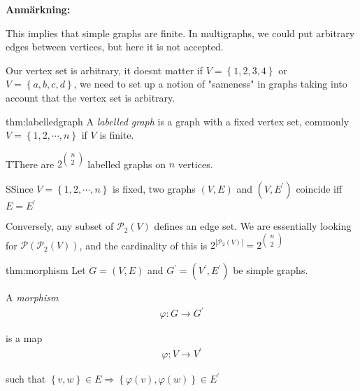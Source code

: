\par\bigskip
\noindent\textbf{Anmärkning:}\par
\noindent This implies that simple graphs are finite. In multigraphs, we could put arbitrary edges between vertices, but here it is not accepted. 
\par\bigskip
\noindent Our vertex set is arbitrary, it doesnt matter if $V=\left\{1,2,3,4\right\}$ or $V = \left\{a,b,c,d\right\}$, we need to set up a notion of "sameness" in graphs taking into account that the vertex set is arbitrary.
\par\bigskip
\begin{theo}{thm:labelledgraph}
A \textit{labelled graph} is a graph with a fixed vertex set, commonly $V = \left\{1,2,\cdots,n\right\}$ if $V$ is finite.
\end{theo}
\newpage
\begin{lem}
  TThere are $2^{\begin{pmatrix}n\\2\end{pmatrix}}$ labelled graphs on $n$ vertices.
\end{lem}
\par\bigskip
\begin{prf}
  SSince $V = \left\{1,2,\cdots,n\right\}$ is fixed, two graphs $(V,E)$ and $(V,E^{\prime})$ coincide iff $E=E^{\prime}$
  \par\bigskip
  \noindent Conversely, any subset of $\mathcal{P}_2(V)$ defines an edge set. We are essentially looking for $\mathcal{P}(\mathcal{P}_2(V))$, and the cardinality of this is $2^{\left|\mathcal{P}_2(V)\right|} = 2^{\begin{pmatrix}n\\2\end{pmatrix}}$
\end{prf}
\par\bigskip
\begin{theo}[Morphism]{thm:morphism}
  Let $G = (V,E)$ and $G^{\prime} = (V^{\prime}, E^{\prime})$ be simple graphs.
  \par\bigskip
  \noindent A \textit{morphism}
  \begin{equation*}
    \begin{gathered}
      \varphi:G\to G^{\prime}
    \end{gathered}
  \end{equation*}\par
  \noindent is a map
  \begin{equation*}
    \begin{gathered}
      \varphi:V\to V^{\prime}
    \end{gathered}
  \end{equation*}\par
\noindent such that $\left\{v,w\right\}\in E\Rightarrow \left\{\varphi(v),\varphi(w)\right\}\in E^{\prime}$
\end{theo}

